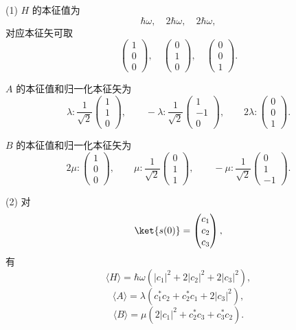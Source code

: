 \begin{solution}
(1) $H$ 的本征值为
\[
\hbar\omega,
\quad 2\hbar\omega,
\quad 2\hbar\omega,
\]
对应本征矢可取
\[
\begin{pmatrix}1\\0\\0\end{pmatrix},
\quad
\begin{pmatrix}0\\1\\0\end{pmatrix},
\quad
\begin{pmatrix}0\\0\\1\end{pmatrix}.
\]

$A$ 的本征值和归一化本征矢为
\[
\lambda:\frac1{\sqrt2}\begin{pmatrix}1\\1\\0\end{pmatrix},
\qquad
-\lambda:\frac1{\sqrt2}\begin{pmatrix}1\\-1\\0\end{pmatrix},
\qquad
2\lambda:\begin{pmatrix}0\\0\\1\end{pmatrix}.
\]

$B$ 的本征值和归一化本征矢为
\[
2\mu:\begin{pmatrix}1\\0\\0\end{pmatrix},
\qquad
\mu:\frac1{\sqrt2}\begin{pmatrix}0\\1\\1\end{pmatrix},
\qquad
-\mu:\frac1{\sqrt2}\begin{pmatrix}0\\1\\-1\end{pmatrix}.
\]

(2) 对
\[
\ket{s(0)}=\begin{pmatrix}c_1\\c_2\\c_3\end{pmatrix},
\]
有
\[
\langle H\rangle=\hbar\omega(|c_1|^2+2|c_2|^2+2|c_3|^2),
\]
\[
\langle A\rangle=\lambda(c_1^*c_2+c_2^*c_1+2|c_3|^2),
\]
\[
\langle B\rangle=\mu(2|c_1|^2+c_2^*c_3+c_3^*c_2).
\]


\end{solution}
